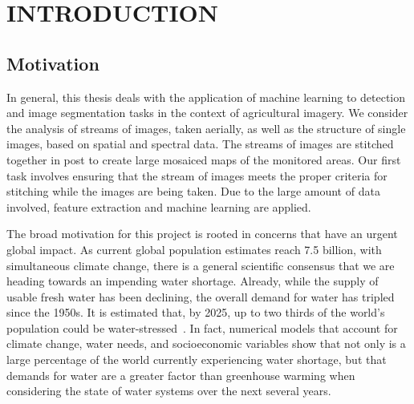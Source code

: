 %
%
%



\pagestyle{plain} %
\setcounter{page}{1}


\chapter{\uppercase {Introduction}}

\section{Motivation}

In general, this thesis deals with the application of machine learning to detection and image segmentation tasks in the context of agricultural imagery.
We consider the analysis of streams of images, taken aerially, as well as the structure of single images, based on spatial and spectral data.
The streams of images are stitched together in post to create large mosaiced maps of the monitored areas.
Our first task involves ensuring that the stream of images meets the proper criteria for stitching while the images are being taken.
Due to the large amount of data involved, feature extraction and machine learning are applied.

The broad motivation for this project is rooted in concerns that have an urgent global impact.
As current global population estimates reach 7.5 billion, with simultaneous climate change, there is a general scientific consensus that we are heading towards an impending water shortage.
Already, while the supply of usable fresh water has been declining, the overall demand for water has tripled since the 1950s.
It is estimated that, by 2025, up to two thirds of the world's population could be water-stressed~\cite{waterresources}.
In fact, numerical models that account for climate change, water needs, and socioeconomic variables show that not only is a large percentage of the world currently experiencing water shortage, but that demands for water are a greater factor than greenhouse warming when considering the state of water systems over the next several years.

